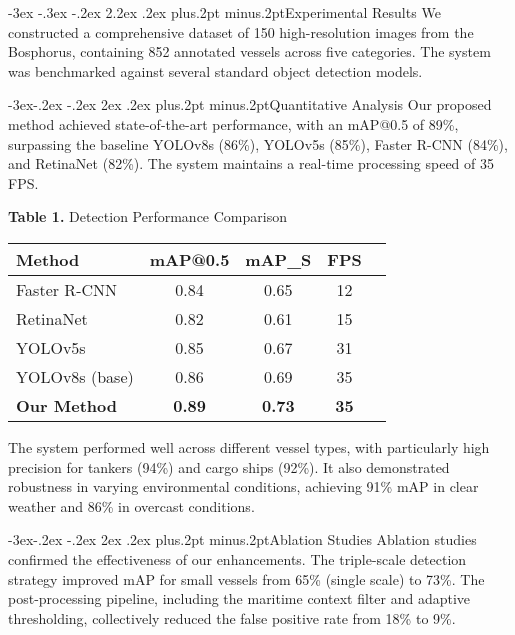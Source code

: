 \documentclass[twoside]{article}
\makeatletter
\def\section{\@startsection{section}{1}{\z@}%
 {-3ex \@plus -.3ex \@minus -.2ex}%
 {2.2ex \@plus.2ex}%
{\normalfont\normalsize\protect\baselineskip=14.5pt plus.2pt minus.2pt\bfseries}}
\def\subsection{\@startsection{subsection}{2}{\z@}%
 {-3ex\@plus -.2ex \@minus -.2ex}%
 {2ex \@plus.2ex}%
{\normalfont\normalsize\protect\baselineskip=12.5pt plus.2pt minus.2pt\bfseries}}
\makeatother
\begin{document}
\begin{multicols}{2}
\section{Experimental Results}
We constructed a comprehensive dataset of 150 high-resolution images from the Bosphorus, containing 852 annotated vessels across five categories\cite{liu2021enhanced,dataset_construction}. The system was benchmarked against several standard object detection models.

\subsection{Quantitative Analysis}
Our proposed method achieved state-of-the-art performance, with an mAP@0.5 of 89\%, surpassing the baseline YOLOv8s (86\%), YOLOv5s (85\%), Faster R-CNN (84\%), and RetinaNet (82\%)\cite{bochkovskiy2020yolov4,performance_comparison}. The system maintains a real-time processing speed of 35 FPS\cite{performance_comparison}.

\begin{center}
{\footnotesize{\bf Table 1.} Detection Performance Comparison}\\
\vspace{2mm}
\footnotesize{
\begin{tabular*}{\linewidth}{@{\extracolsep{\fill}}lcccc}
\hline
Method & mAP@0.5 & mAP\_S & FPS \\
\hline
Faster R-CNN & 0.84 & 0.65 & 12 \\
RetinaNet & 0.82 & 0.61 & 15 \\
YOLOv5s & 0.85 & 0.67 & 31 \\
YOLOv8s (base) & 0.86 & 0.69 & 35 \\
\textbf{Our Method} & \textbf{0.89} & \textbf{0.73} & \textbf{35} \\
\hline
\end{tabular*}
}
\end{center}

The system performed well across different vessel types, with particularly high precision for tankers (94\%) and cargo ships (92\%)\cite{vessel_type_performance}. It also demonstrated robustness in varying environmental conditions, achieving 91\% mAP in clear weather and 86\% in overcast conditions\cite{weather_robustness}.

\subsection{Ablation Studies}
Ablation studies confirmed the effectiveness of our enhancements. The triple-scale detection strategy improved mAP for small vessels from 65\% (single scale) to 73\%\cite{chen2020improved}. The post-processing pipeline, including the maritime context filter and adaptive thresholding, collectively reduced the false positive rate from 18\% to 9\%\cite{ultralytics2023yolov8,post_processing_improvement}.


\end{multicols}
\end{document}
